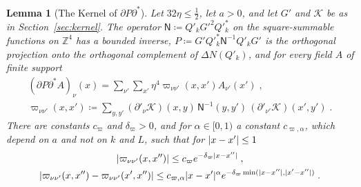 \documentclass[11pt]{preprint}
\DeclarePairedDelimiter{\abs}{\lvert}{\rvert}
\numberwithin{equation}{section}
\newtheorem{lemma}[theorem]{Lemma}
\theoremstyle{definition}
\theoremstyle{remark}
\theoremstyle{plain}
\begin{document}
\begin{lemma}[The Kernel of $\partial P\partial^*$]\label{lem:projection-kernel}
Let $32\eta \leq \frac12$, let $a > 0$, and let $G'$ and $\mathcal K$ be as in Section~\ref{sec:kernel}. The operator $\mathsf N \coloneqq Q'_kG'^2Q'^*_k$ on the square-summable functions on $\mathbb Z^4$ has a bounded inverse, $P \coloneqq G'Q'^*_k\mathsf N^{-1}Q'_kG'$ is the orthogonal projection onto the orthogonal complement of $\Delta N(Q'_k)$, and for every field $A$ of finite support
\begin{equation}\label{eq:projection-kernel}
\begin{gathered}
    (\partial P\partial^*A)_\nu(x) = \sum_{\nu'}\sum_{x'}\eta^4\varpi_{\nu\nu'}(x, x')A_{\nu'}(x')\;,\\
    \varpi_{\nu\nu'}(x, x') \coloneqq \sum_{y,y'}(\partial'_\nu\mathcal K)(x, y)\,\mathsf N^{-1}(y, y')\,(\partial'_{\nu'}\mathcal K)(x', y')\;.
\end{gathered}
\end{equation}
There are constants $c_\varpi$ and $\delta_\varpi > 0$, and for $\alpha \in [0, 1)$ a constant $c_{\varpi,\alpha}$, which depend on $a$ and not on $k$ and $L$, such that for $\abs{x - x'} \leq 1$
\begin{equation}\label{eq:projection-bounds}
\begin{gathered}
    \abs{\varpi_{\nu\nu'}(x, x'')} \leq c_\varpi e^{-\delta_\varpi\abs{x - x''}}\;,\\
    \abs{\varpi_{\nu\nu'}(x, x'') - \varpi_{\nu\nu'}(x', x'')} \leq c_{\varpi,\alpha}\abs{x - x'}^\alpha e^{-\delta_\varpi\min(\abs{x - x''}, \abs{x' - x''})}\;.
\end{gathered}
\end{equation}
\end{lemma}
\end{document}
